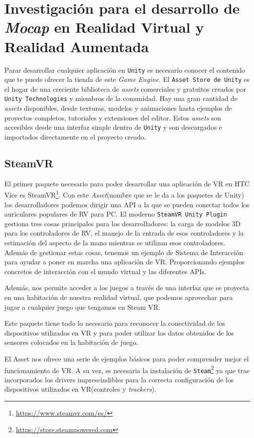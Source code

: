 \section{Investigación para el desarrollo de \textit{Mocap} en Realidad Virtual y Realidad Aumentada}

Parar desarrollar cualquier aplicación en \texttt{Unity} es necesario conocer el contenido que te puede ofrecer la tienda de este \textit{Game Engine}. El \texttt{Asset Store de Unity} es el hogar de una creciente biblioteca de \textit{assets} comerciales y gratuitos creados por \texttt{Unity Technologies} y miembros de la comunidad. Hay una gran cantidad de \textit{assets} disponibles, desde texturas, modelos y animaciones hasta ejemplos de proyectos completos, tutoriales y extensiones del editor. Estos \textit{assets} son accesibles desde una interfaz simple dentro de \texttt{Unity} y son descargados e importados directamente en el proyecto creado.

\subsection{SteamVR}

El primer paquete necesario para poder desarrollar una aplicación de VR en HTC Vice es SteamVR\footnote{\url{https://www.steamvr.com/es/}}. Con este \textit{Asset}(nombre que se le da a los paquetes de Unity) los desarrolladores podemos dirigir una API a la que se pueden conectar todos los auriculares populares de RV para PC. El moderno \texttt{SteamVR Unity Plugin} gestiona tres cosas principales para los desarrolladores: la carga de modelos 3D para los controladores de RV, el manejo de la entrada de esos controladores y la estimación del aspecto de la mano mientras se utilizan esos controladores. Además de gestionar estas cosas, tenemos un ejemplo de Sistema de Interacción para ayudar a poner en marcha una aplicación de VR. Proporcionando ejemplos concretos de interacción con el mundo virtual y las diferentes APIs. 

Además, nos permite acceder a los juegos a través de una interfaz que se proyecta en una habitación de nuestra realidad virtual, que podemos aprovechar para jugar a cualquier juego que tengamos en Steam VR.

Este paquete tiene todo lo necesario para reconocer la conectividad de los dispositivos utilizados en VR y para poder utilizar los datos obtenidos de los sensores colocados en la habitación de juego. 

El Asset nos ofrece una serie de ejemplos básicos para poder comprender mejor el funcionamiento de VR. A su vez, es necesaria la instalación de \texttt{Steam}\footnote{\url{ https://store.steampowered.com}} ya que trae incorporados los drivers imprescindibles para la correcta configuración de los dispositivos utilizados en VR(controles y \textit{trackers}).

